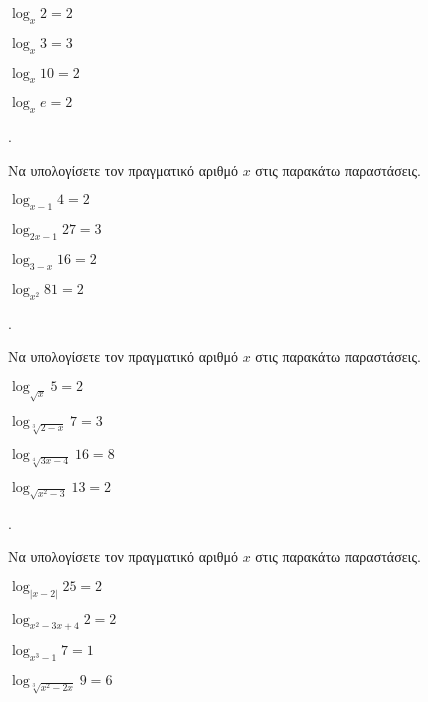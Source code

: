 \documentclass[11pt,a4paper,twocolumn]{article}
\newcounter{askhsh}
\newcommand{\askhsh}{\large\theaskhsh.\ \addtocounter{askhsh}{1}}
\begin{document}
\begin{multicols}{2}
\begin{alist}
\item $ \log_{x}{2}=2 $
\item $ \log_{x}{3}=3 $
\item $ \log_{x}{10}=2 $
\item $ \log_{x}{e}=2 $
\end{alist}
\end{multicols}
\askhsh Να υπολογίσετε τον πραγματικό αριθμό $ x $ στις παρακάτω παραστάσεις.
\begin{multicols}{2}
\begin{alist}
\item $ \log_{x-1}{4}=2 $
\item $ \log_{2x-1}{27}=3 $
\item $ \log_{3-x}{16}=2 $
\item $ \log_{x^2}{81}=2 $
\end{alist}
\end{multicols}
\askhsh Να υπολογίσετε τον πραγματικό αριθμό $ x $ στις παρακάτω παραστάσεις.
\begin{multicols}{2}
\begin{alist}
\item $ \log_{\sqrt{x}}{5}=2 $
\item $ \log_{\sqrt[3]{2-x}}{7}=3 $
\item $ \log_{\sqrt[4]{3x-4}}{16}=8 $
\item $ \log_{\sqrt{x^2-3}}{13}=2 $
\end{alist}
\end{multicols}
\askhsh Να υπολογίσετε τον πραγματικό αριθμό $ x $ στις παρακάτω παραστάσεις.
\begin{multicols}{2}
\begin{alist}
\item $ \log_{|x-2|}{25}=2 $
\item $ \log_{x^2-3x+4}{2}=2 $
\item $ \log_{x^3-1}{7}=1 $
\item $ \log_{\sqrt[3]{x^2-2x}}{9}=6 $
\end{alist}
\end{multicols}
\end{document}
